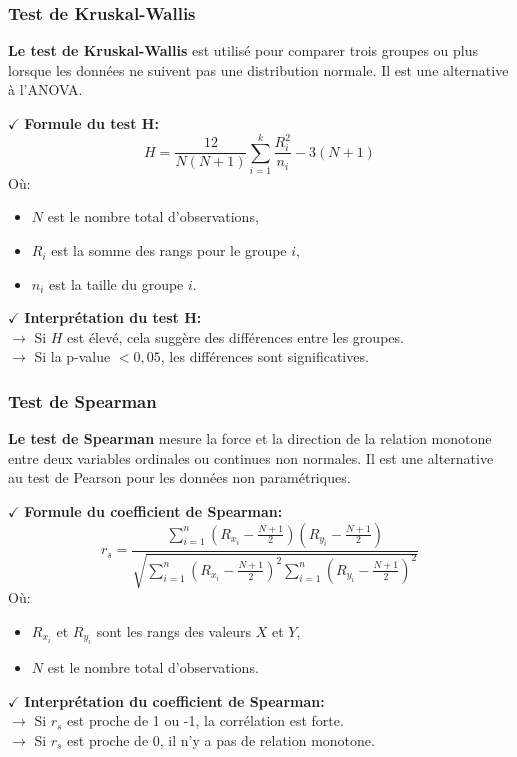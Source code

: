 \subsubsection{Test de Kruskal-Wallis}

\textbf{Le test de Kruskal-Wallis} est utilisé pour comparer trois groupes ou plus lorsque les données ne suivent pas une distribution normale. Il est une alternative à l'ANOVA.

\textbf{\(\checkmark\)} \textbf{Formule du test H:}
\[
H = \frac{12}{N(N+1)} \sum_{i=1}^{k} \frac{R_i^2}{n_i} - 3(N+1)
\]
Où:
\begin{itemize}
    \item \( N \) est le nombre total d'observations,
    \item \( R_i \) est la somme des rangs pour le groupe \( i \),
    \item \( n_i \) est la taille du groupe \( i \).
\end{itemize}

\textbf{\(\checkmark\)} \textbf{Interprétation du test H:}\\
    \textbf{\(\rightarrow\)} Si \( H \) est élevé, cela suggère des différences entre les groupes.\\
    \textbf{\(\rightarrow\)} Si la p-value \( < 0{,}05 \), les différences sont significatives.

\subsubsection{Test de Spearman}

\textbf{Le test de Spearman} \cite{spearman} mesure la force et la direction de la relation monotone entre deux variables ordinales ou continues non normales. Il est une alternative au test de Pearson pour les données non paramétriques.

\textbf{\(\checkmark\)} \textbf{Formule du coefficient de Spearman:}
\[
r_s = \frac{\sum_{i=1}^{n} (R_{x_i} - \frac{N+1}{2})(R_{y_i} - \frac{N+1}{2})}{\sqrt{\sum_{i=1}^{n} (R_{x_i} - \frac{N+1}{2})^2 \sum_{i=1}^{n} (R_{y_i} - \frac{N+1}{2})^2}}
\]
Où:
\begin{itemize}
    \item \( R_{x_i} \) et \( R_{y_i} \) sont les rangs des valeurs \( X \) et \( Y \),
    \item \( N \) est le nombre total d'observations.
\end{itemize}

\textbf{\(\checkmark\)} \textbf{Interprétation du coefficient de Spearman:}\\
    \textbf{\(\rightarrow\)} Si \( r_s \) est proche de 1 ou -1, la corrélation est forte.\\
    \textbf{\(\rightarrow\)} Si \( r_s \) est proche de 0, il n'y a pas de relation monotone.

